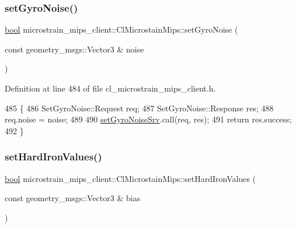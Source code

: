 \subsubsection{\texorpdfstring{set\+Gyro\+Noise()}{setGyroNoise()}}
{\footnotesize\ttfamily \hyperlink{classbool}{bool} microstrain\+\_\+mips\+\_\+client\+::\+Cl\+Microstain\+Mips\+::set\+Gyro\+Noise (\begin{DoxyParamCaption}\item[{const geometry\+\_\+msgs\+::\+Vector3 \&}]{noise }\end{DoxyParamCaption})\hspace{0.3cm}{\ttfamily [inline]}}



Definition at line 484 of file cl\+\_\+microstrain\+\_\+mips\+\_\+client.\+h.


\begin{DoxyCode}
485     \{
486         SetGyroNoise::Request req;
487         SetGyroNoise::Response res;
488         req.noise = noise;
489 
490         \hyperlink{classmicrostrain__mips__client_1_1ClMicrostainMips_a062ecab1da692e2205636e081dc7b107}{setGyroNoiseSrv}.call(req, res);
491         \textcolor{keywordflow}{return} res.success;
492     \}
\end{DoxyCode}
\mbox{\label{classmicrostrain__mips__client_1_1ClMicrostainMips_afdc49a602ec8906792b3e8ea8a173ceb}} 
\subsubsection{\texorpdfstring{set\+Hard\+Iron\+Values()}{setHardIronValues()}}
{\footnotesize\ttfamily \hyperlink{classbool}{bool} microstrain\+\_\+mips\+\_\+client\+::\+Cl\+Microstain\+Mips\+::set\+Hard\+Iron\+Values (\begin{DoxyParamCaption}\item[{const geometry\+\_\+msgs\+::\+Vector3 \&}]{bias }\end{DoxyParamCaption})\hspace{0.3cm}{\ttfamily [inline]}}



